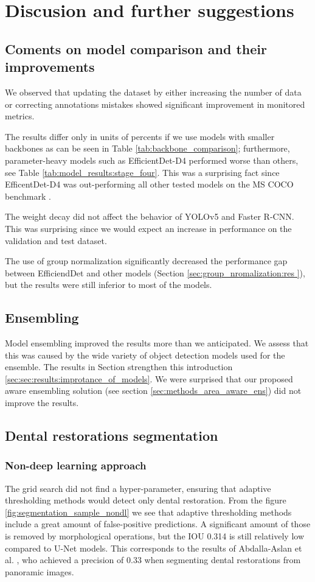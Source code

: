 \chapter{Discusion and further suggestions}
\label{chapter:discusion}

\section{Coments on model comparison and their improvements}
We observed that updating the dataset by either increasing the number of data or correcting annotations mistakes showed significant improvement in monitored metrics.

The results differ only in units of percents if we use models with smaller backbones as can be seen in Table \ref{tab:backbone_comparison}; furthermore, parameter-heavy models such as EfficientDet-D4 performed worse than others, see Table \ref{tab:model_results:stage_four}. This was a surprising fact since EfficentDet-D4 was out-performing all other tested models on the MS COCO benchmark \cite{paperwithcode,Tan2019}.


The weight decay did not affect the behavior of YOLOv5 and Faster R-CNN. This was surprising since we would expect an increase in performance on the validation and test dataset.

The use of group normalization significantly decreased the performance gap between EfficiendDet and other models (Section \ref{sec:group_nromalization:res }), but the results were still inferior to most of the models.


\section{Ensembling}
Model ensembling improved the results more than we anticipated. We assess that this was caused by the wide variety of object detection models used for the ensemble. The results in Section strengthen this introduction \ref{sec:sec:results:improtance_of_models}. We were surprised that our proposed aware ensembling solution (see section \ref{sec:methods_area_aware_ens}) did not improve the results.

\section{Dental restorations segmentation}
\subsection{Non-deep learning approach}
The grid search did not find a hyper-parameter, ensuring that adaptive thresholding methods would detect only dental restoration. From the figure \ref{fig:segmentation_sample_nondl} we see that adaptive thresholding methods include a great amount of false-positive predictions. A significant amount of those is removed by morphological operations, but the IOU 0.314 is still relatively low compared to U-Net models. This corresponds to the results of Abdalla-Aslan et al. \cite{AbdallaAslan2020}, who achieved a precision of 0.33 when segmenting dental restorations from panoramic images.
